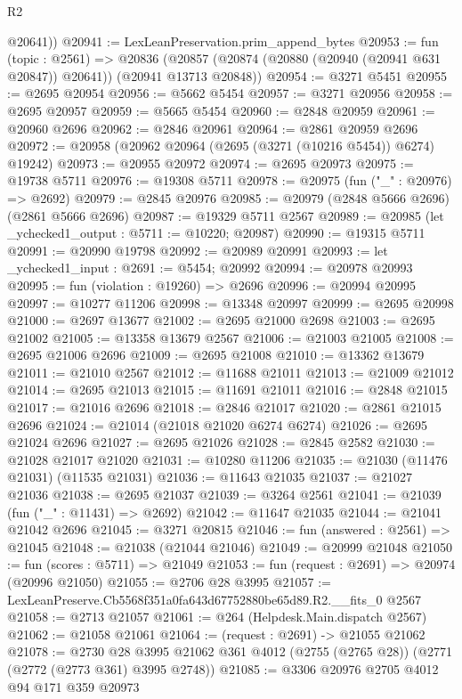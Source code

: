 \begin{lexlean}{R2}
\begin{coremodule}
        @20641))
@20941 := LexLeanPreservation.prim_append_bytes
@20953 := fun (topic : @2561) =>
  @20836 (@20857 (@20874 (@20880 (@20940 (@20941 @631 @20847)) @20641)) (@20941 @13713 @20848))
@20954 := @3271 @5451
@20955 := @2695 @20954
@20956 := @5662 @5454
@20957 := @3271 @20956
@20958 := @2695 @20957
@20959 := @5665 @5454
@20960 := @2848 @20959
@20961 := @20960 @2696
@20962 := @2846 @20961
@20964 := @2861 @20959 @2696
@20972 := @20958 (@20962 @20964 (@2695 (@3271 (@10216 @5454)) @6274) @19242)
@20973 := @20955 @20972
@20974 := @2695 @20973
@20975 := @19738 @5711
@20976 := @19308 @5711
@20978 := @20975 (fun ("_" : @20976) => @2692)
@20979 := @2845 @20976
@20985 := @20979 (@2848 @5666 @2696) (@2861 @5666 @2696)
@20987 := @19329 @5711 @2567
@20989 := @20985 (let _ychecked1_output : @5711 := @10220; @20987)
@20990 := @19315 @5711
@20991 := @20990 @19798
@20992 := @20989 @20991
@20993 := let _ychecked1_input : @2691 := @5454; @20992
@20994 := @20978 @20993
@20995 := fun (violation : @19260) => @2696
@20996 := @20994 @20995
@20997 := @10277 @11206
@20998 := @13348 @20997
@20999 := @2695 @20998
@21000 := @2697 @13677
@21002 := @2695 @21000 @2698
@21003 := @2695 @21002
@21005 := @13358 @13679 @2567
@21006 := @21003 @21005
@21008 := @2695 @21006 @2696
@21009 := @2695 @21008
@21010 := @13362 @13679
@21011 := @21010 @2567
@21012 := @11688 @21011
@21013 := @21009 @21012
@21014 := @2695 @21013
@21015 := @11691 @21011
@21016 := @2848 @21015
@21017 := @21016 @2696
@21018 := @2846 @21017
@21020 := @2861 @21015 @2696
@21024 := @21014 (@21018 @21020 @6274 @6274)
@21026 := @2695 @21024 @2696
@21027 := @2695 @21026
@21028 := @2845 @2582
@21030 := @21028 @21017 @21020
@21031 := @10280 @11206
@21035 := @21030 (@11476 @21031) (@11535 @21031)
@21036 := @11643 @21035
@21037 := @21027 @21036
@21038 := @2695 @21037
@21039 := @3264 @2561
@21041 := @21039 (fun ("_" : @11431) => @2692)
@21042 := @11647 @21035
@21044 := @21041 @21042 @2696
@21045 := @3271 @20815
@21046 := fun (answered : @2561) => @21045
@21048 := @21038 (@21044 @21046)
@21049 := @20999 @21048
@21050 := fun (scores : @5711) => @21049
@21053 := fun (request : @2691) => @20974 (@20996 @21050)
@21055 := @2706 @28 @3995
@21057 := LexLeanPreserve.Cb5568f351a0fa643d67752880be65d89.R2.__fits_0 @2567
@21058 := @2713 @21057
@21061 := @264 (Helpdesk.Main.dispatch @2567)
@21062 := @21058 @21061
@21064 := (request : @2691) -> @21055 @21062
@21078 := @2730
    @28
    @3995
    @21062
    @361
    @4012
    (@2755 (@2765 @28))
    (@2771 (@2772 (@2773 @361) @3995 @2748))
@21085 := @3306 @20976 @2705 @4012 @94 @171 @359 @20973

\end{coremodule}
\end{lexlean}

